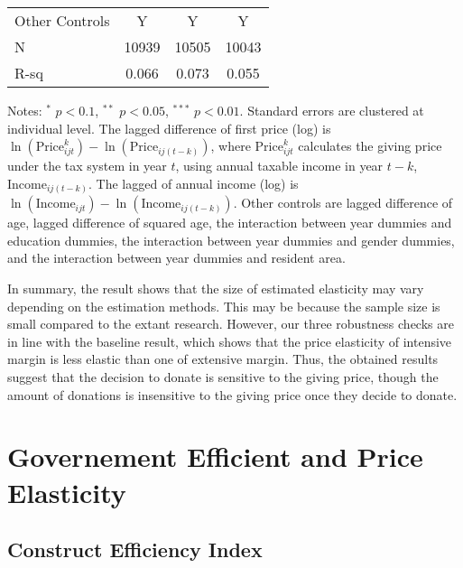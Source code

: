 \documentclass[ review  , 3p ]{elsarticle}
\begin{document}
\begin{table}
\begin{threeparttable}
\begin{tabular}[t]{lccc}
  \hspace{1em}Other Controls & Y & Y & Y\\
  \hspace{1em}N & 10939 & 10505 & 10043\\
  \hspace{1em}R-sq & 0.066 & 0.073 & 0.055\\
  \bottomrule
  \end{tabular}
  \begin{tablenotes}
  \item Notes: $^{*}$ $p < 0.1$, $^{**}$ $p < 0.05$, $^{***}$ $p < 0.01$. Standard errors are clustered at individual level. The lagged difference of first price (log) is $\ln(\text{Price}^k_{ijt}) - \ln(\text{Price}_{ij(t-k)})$, where $\text{Price}^k_{ijt}$ calculates the giving price under the tax system in year $t$, using annual taxable income in year $t-k$, $\text{Income}_{ij(t-k)}$. The lagged of annual income (log) is $\ln(\text{Income}_{ijt}) - \ln(\text{Income}_{ij(t-k)})$. Other controls are lagged difference of age, lagged difference of squared age, the interaction between year dummies and education dummies, the interaction between year dummies and gender dummies, and the interaction between year dummies and resident area.
  \end{tablenotes}
  \end{threeparttable}
  \end{table}

  In summary, the result shows that the size of estimated elasticity may vary depending on the estimation methods. This may be because the sample size is small compared to the extant research. However, our three robustness checks are in line with the baseline result, which shows that the price elasticity of intensive margin is less elastic than one of extensive margin. Thus, the obtained results suggest that the decision to donate is sensitive to the giving price, though the amount of donations is insensitive to the giving price once they decide to donate.

  \hypertarget{governement-efficient-and-price-elasticity}{%
  \section{Governement Efficient and Price Elasticity}\label{governement-efficient-and-price-elasticity}}

  \hypertarget{construct-efficiency-index}{%
  \subsection{Construct Efficiency Index}\label{construct-efficiency-index}}
\end{document}
